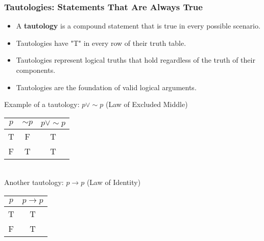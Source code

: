 \documentclass{beamer}
\begin{document}
                        \begin{frame}
                        \frametitle{Tautologies: Statements That Are Always True}
                        \begin{itemize}
                            \item A \textbf{tautology} is a compound statement that is true in every possible scenario.
                            \item Tautologies have "T" in every row of their truth table.
                            \item Tautologies represent logical truths that hold regardless of the truth of their components.
                            \item Tautologies are the foundation of valid logical arguments.
                        \end{itemize}
                        
                        \begin{example}
                            \scriptsize
                        Example of a tautology: $p \vee \sim p$ (Law of Excluded Middle)\\[0.2cm]
                        \begin{tabular}{|c|c|c|}
                        \hline
                        $p$ & $\sim p$ & $p \vee \sim p$ \\
                        \hline
                        T & F & T \\
                        \hline
                        F & T & T \\
                        \hline
                        \end{tabular}\\[0.3cm]
                        Another tautology: $p \rightarrow p$ (Law of Identity)\\[0.2cm]
                        \begin{tabular}{|c|c|}
                        \hline
                        $p$ & $p \rightarrow p$ \\
                        \hline
                        T & T \\
                        \hline
                        F & T \\
                        \hline
                        \end{tabular}
                        \end{example}
                        \end{frame}
\end{document}
